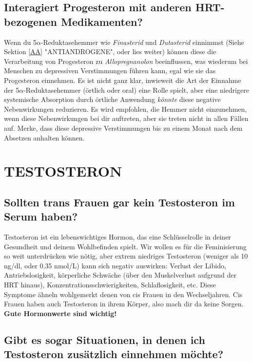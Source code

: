 \documentclass{article}
\begin{document}
\subsection{Interagiert Progesteron mit anderen HRT-bezogenen Medikamenten?}\label{8-18}

Wenn du 5$\alpha$-Reduktasehemmer wie \textit{Finasterid} und \textit{Dutasterid} einnimmst (Siehe Sektion \ref{AA} "ANTIANDROGENE", oder lies weiter) können diese die Verarbeitung von Progesteron zu \textit{Allopregnanolon} beeinflussen, was wiederum bei Menschen zu depressiven Verstimmungen führen kann, egal wie sie das Progesteron einnehmen. Es ist nicht ganz klar, inwieweit die Art der Einnahme der 5$\alpha$-Reduktasehemmer (örtlich oder oral) eine Rolle spielt, aber eine niedrigere systemische Absorption durch örtliche Anwendung \textit{könnte }diese negative Nebenwirkungen reduzieren. Es wird empfohlen, die Hemmer nicht einzunehmen, wenn diese Nebenwirkungen bei dir auftreten, aber sie treten nicht in allen Fällen auf. Merke, dass diese depressive Verstimmungen bis zu einem Monat nach dem Absetzen anhalten können. 

\section{TESTOSTERON}\label{T}

\subsection{Sollten trans Frauen \textbf{gar kein} Testosteron im Serum haben?}

Testosteron ist ein lebenswichtiges Hormon, das eine Schlüsselrolle in deiner Gesundheit und deinem Wohlbefinden spielt. Wir wollen es für die Feminisierung so weit unterdrücken wie nötig, aber extrem niedriges Testosteron (weniger als 10 ng/dl, oder 0.35 nmol/L) kann sich negativ auswirken: Verlust der Libido, Antriebslosigkeit, körperliche Schwäche (über den Muskelverlust aufgrund der HRT hinaus), Konzentrationsschwierigkeiten, Schlaflosigkeit, etc. Diese Symptome ähneln wohlgemerkt denen von cis Frauen in den Wechseljahren. Cis Frauen haben auch Testosteron in ihrem Körper, also mach dir da keine Sorgen. \textbf{Gute Hormonwerte sind wichtig!}

\subsection{Gibt es sogar Situationen, in denen ich Testosteron zusätzlich einnehmen möchte?}\label{9-2}
\end{document}
